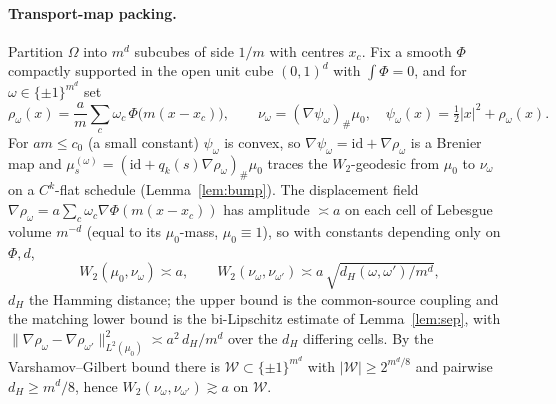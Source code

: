 \documentclass[11pt]{article}
\theoremstyle{definition}
\theoremstyle{remark}
\begin{document}
\paragraph{Transport-map packing.} Partition $\Omega$ into $m^d$ subcubes of side $1/m$ with centres
$x_c$. Fix a smooth $\Phi$ compactly supported in the open unit cube $(0,1)^d$ with $\int\Phi=0$, and for
$\omega\in\{\pm1\}^{m^d}$ set
\[
  \rho_\omega(x)=\frac{a}{m}\sum_c \omega_c\,\Phi\big(m(x-x_c)\big),\qquad
  \nu_\omega=(\nabla\psi_\omega)_\#\mu_0,\quad \psi_\omega(x)=\tfrac12|x|^2+\rho_\omega(x).
\]
For $am\le c_0$ (a small constant) $\psi_\omega$ is convex, so $\nabla\psi_\omega=\mathrm{id}+\nabla\rho_\omega$
is a Brenier map and $\mu_s^{(\omega)}=(\mathrm{id}+q_k(s)\nabla\rho_\omega)_\#\mu_0$ traces the
$W_2$-geodesic from $\mu_0$ to $\nu_\omega$ on a $C^k$-flat schedule (Lemma~\ref{lem:bump}). The
displacement field $\nabla\rho_\omega=a\sum_c\omega_c\nabla\Phi(m(x-x_c))$ has amplitude $\asymp a$ on
each cell of Lebesgue volume $m^{-d}$ (equal to its $\mu_0$-mass, $\mu_0\equiv1$), so with constants
depending only on $\Phi,d$,
\[
  W_2(\mu_0,\nu_\omega)\asymp a,\qquad
  W_2(\nu_\omega,\nu_{\omega'})\asymp a\,\sqrt{d_H(\omega,\omega')/m^d},
\]
$d_H$ the Hamming distance; the upper bound is the common-source coupling and the matching lower
bound is the bi-Lipschitz estimate of Lemma~\ref{lem:sep}, with
$\|\nabla\rho_\omega-\nabla\rho_{\omega'}\|_{L^2(\mu_0)}^2\asymp a^2\,d_H/m^d$ over the $d_H$ differing
cells. By the Varshamov--Gilbert bound there is
$\mathcal W\subset\{\pm1\}^{m^d}$ with $|\mathcal W|\ge 2^{m^d/8}$ and pairwise $d_H\ge m^d/8$, hence
$W_2(\nu_\omega,\nu_{\omega'})\gtrsim a$ on $\mathcal W$.
\end{document}
